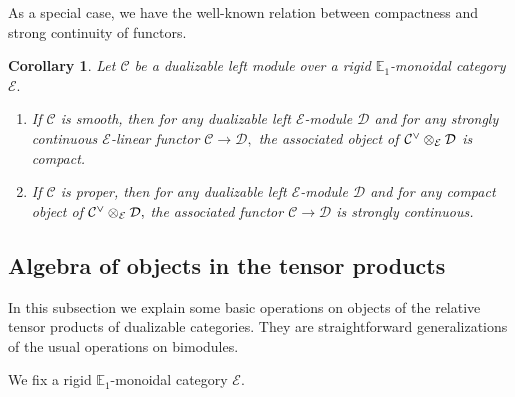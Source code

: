 \documentclass[11pt,leqno]{amsart}
\newtheorem{cor}[theo]{Corollary}
\numberwithin{equation}{section}
\newcommand{\tens}[1]{%
  \mathbin{\mathop{\otimes}\displaylimits_{#1}}%
}
\newcommand{\bE}{{\mathbb E}}
\newcommand{\cD}{{\mathcal D}}
\newcommand{\cC}{{\mathcal C}}
\newcommand{\cE}{{\mathcal E}}
\begin{document}
As a special case, we have the well-known relation between compactness and strong continuity of functors.

\begin{cor}
	Let $\cC$ be a dualizable left module over a rigid $\bE_1$-monoidal category $\cE.$
	\begin{enumerate}[label=(\roman*),ref=(\roman*)]
		\item If $\cC$ is smooth, then for any dualizable left $\cE$-module $\cD$ and for any strongly continuous $\cE$-linear functor $\cC\to\cD,$ the associated object of $\cC^{\vee}\tens{\cE}\cD$ is compact.
		\item If $\cC$ is proper, then for any dualizable left $\cE$-module $\cD$ and for any compact object of $\cC^{\vee}\tens{\cE}\cD,$ the associated functor $\cC\to\cD$ is strongly continuous.  
	\end{enumerate}
\end{cor}

\subsection{Algebra of objects in the tensor products}

In this subsection we explain some basic operations on objects of the relative tensor products of dualizable categories. They are straightforward generalizations of the usual operations on bimodules.

We fix a rigid $\bE_1$-monoidal category $\cE.$
\end{document}
